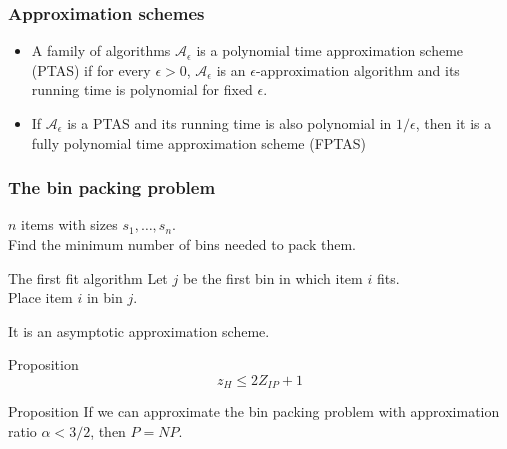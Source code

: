 \documentclass[9pt,handout]{beamer}
\begin{document}
\begin{frame}
\frametitle{Approximation schemes}
\begin{itemize}
\item A family of algorithms $\mathcal A_{\epsilon}$ is a
\alert{polynomial time approximation scheme (PTAS)}
if for every $\epsilon>0$, $\mathcal A_{\epsilon}$ is an $\epsilon$-approximation
algorithm and its running time is polynomial for fixed $\epsilon$.\bigskip
\item If $\mathcal A_{\epsilon}$ is a PTAS and its running time is also
polynomial in $1/\epsilon$, then it is a 
\alert{fully polynomial time approximation scheme (FPTAS)}
\end{itemize}
\end{frame}
\begin{frame}
\frametitle{The bin packing problem}
$n$ items with sizes $s_1, \ldots, s_n$.\\
Find the minimum number of bins needed to \alert{pack them}.
\begin{block}{The first fit algorithm}
Let $j$ be the \alert{first bin} in which item $i$ \alert{fits}.\\
Place item $i$ in bin $j$.
\end{block}
It is an asymptotic approximation scheme.
\begin{block}{Proposition}
$$z_H \leq 2Z_{IP} + 1$$
\end{block}
\begin{block}{Proposition}
If we can approximate the bin packing problem with approximation ratio 
$\alpha<3/2$, then $P=NP$.
\end{block}
\end{frame}
\end{document}
